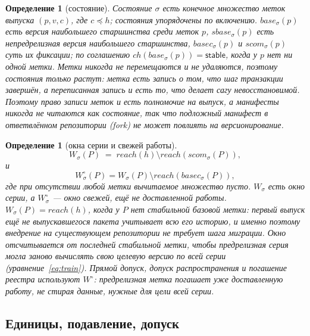 \documentclass[sigconf,nonacm]{acmart}
\theoremstyle{acmplain}
\theoremstyle{acmdefinition}
\newtheorem{definition}[theorem]{Определение}
\theoremstyle{acmplain}
\begin{document}
\begin{definition}[состояние]
\label{def:state}
Состояние $\sigma$ есть конечное множество меток выпуска $(p, v, c)$, где
$c \preceq h$; состояния упорядочены по включению. $\mathit{base}_\sigma(p)$
есть версия наибольшего старшинства среди меток $p$,
$\mathit{sbase}_\sigma(p)$ есть \emph{непредрелизная} версия наибольшего старшинства,
$\mathit{basec}_\sigma(p)$ и $\mathit{scom}_\sigma(p)$ суть их
фиксации; по соглашению $\mathit{ch}(\mathit{base}_\sigma(p)) = \mathsf{stable}$,
когда у $p$ нет ни одной метки. Метки никогда не перемещаются и не удаляются, поэтому
состояния только растут: метка есть запись о том, что шаг транзакции
завершён, а переписанная запись и есть то, что делает сагу невосстановимой.
Поэтому право записи меток и есть полномочие на выпуск, а манифесты никогда не
читаются как состояние, так что подложный манифест в ответвлённом репозитории (fork) не может
повлиять на версионирование.
\end{definition}

\begin{definition}[окна серии и свежей работы]
\label{def:window}
\begin{equation}
  W_\sigma(P) \;=\; \mathit{reach}(h) \setminus
                    \mathit{reach}(\mathit{scom}_\sigma(P)),
  \label{eq:window}
\end{equation}
и
\begin{equation}
  W^\circ_\sigma(P)=W_\sigma(P)\setminus
  \mathit{reach}(\mathit{basec}_\sigma(P)), \label{eq:fresh}
\end{equation}
где при отсутствии любой метки вычитаемое множество пусто. $W_\sigma$ есть
окно серии, а $W^\circ_\sigma$ --- окно свежей, ещё не доставленной работы.
$W_\sigma(P) = \mathit{reach}(h)$, когда у $P$ нет стабильной базовой метки:
первый выпуск ещё не выпускавшегося пакета учитывает всю его
историю, и именно поэтому внедрение на существующем репозитории не требует
шага миграции. Окно отсчитывается от последней \emph{стабильной} метки,
чтобы предрелизная серия могла заново вычислять свою целевую версию по всей
серии (уравнение~\ref{eq:train}). Прямой допуск, допуск распространения и
погашение реестра используют $W^\circ$: предрелизная метка погашает уже
доставленную работу, не стирая данные, нужные для цели всей серии.
\end{definition}

\subsection{Единицы, подавление, допуск}
\end{document}
